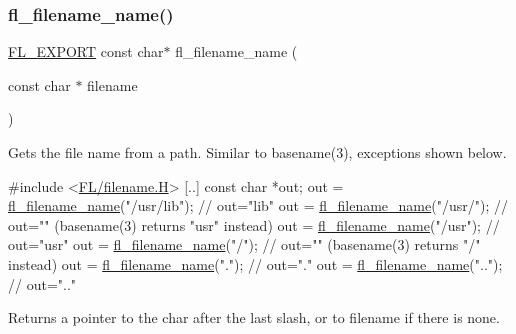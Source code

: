 \subsubsection{\texorpdfstring{fl\+\_\+filename\+\_\+name()}{fl\_filename\_name()}}
{\footnotesize\ttfamily \hyperlink{_fl___export_8_h_aa9ba29a18aee9d738370a06eeb4470fc}{F\+L\+\_\+\+E\+X\+P\+O\+RT} const char$\ast$ fl\+\_\+filename\+\_\+name (\begin{DoxyParamCaption}\item[{const char $\ast$}]{filename }\end{DoxyParamCaption})}

Gets the file name from a path. Similar to basename(3), exceptions shown below. 
\begin{DoxyCode}
\textcolor{preprocessor}{#include <\hyperlink{filename_8_h}{FL/filename.H}>}
[..]
\textcolor{keyword}{const} \textcolor{keywordtype}{char} *out;
out = \hyperlink{group__filenames_ga0ac0f44a1709c6ff94f56a8954dc8fd6}{fl\_filename\_name}(\textcolor{stringliteral}{"/usr/lib"});     \textcolor{comment}{// out="lib"}
out = \hyperlink{group__filenames_ga0ac0f44a1709c6ff94f56a8954dc8fd6}{fl\_filename\_name}(\textcolor{stringliteral}{"/usr/"});        \textcolor{comment}{// out=""      (basename(3) returns "usr" instead)}
out = \hyperlink{group__filenames_ga0ac0f44a1709c6ff94f56a8954dc8fd6}{fl\_filename\_name}(\textcolor{stringliteral}{"/usr"});         \textcolor{comment}{// out="usr"}
out = \hyperlink{group__filenames_ga0ac0f44a1709c6ff94f56a8954dc8fd6}{fl\_filename\_name}(\textcolor{stringliteral}{"/"});            \textcolor{comment}{// out=""      (basename(3) returns "/" instead)}
out = \hyperlink{group__filenames_ga0ac0f44a1709c6ff94f56a8954dc8fd6}{fl\_filename\_name}(\textcolor{stringliteral}{"."});            \textcolor{comment}{// out="."}
out = \hyperlink{group__filenames_ga0ac0f44a1709c6ff94f56a8954dc8fd6}{fl\_filename\_name}(\textcolor{stringliteral}{".."});           \textcolor{comment}{// out=".."}
\end{DoxyCode}
 \begin{DoxyReturn}{Returns}
a pointer to the char after the last slash, or to {\ttfamily filename} if there is none. 
\end{DoxyReturn}
\mbox{\label{group__filenames_gaf0cfb5d9ee6743caf9ede70032bd2a9b}} 
